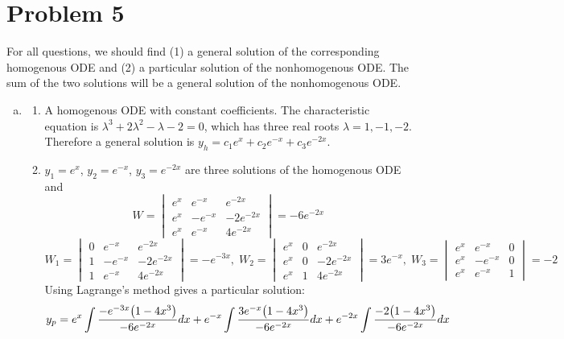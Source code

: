 \documentclass[10pt]{article}
\begin{document}
\section*{Problem 5}
For all questions, we should find (1) a general solution of the corresponding homogenous ODE and (2) a particular solution of the nonhomogenous ODE.
The sum of the two solutions will be a general solution of the nonhomogenous ODE.
\begin{enumerate}[(a), leftmargin=*]
    \item \begin{enumerate}[(1), leftmargin=*]
        \item A homogenous ODE with constant coefficients. The characteristic equation is $\lambda^3 + 2\lambda^2 - \lambda - 2 = 0$, which has three real roots $\lambda = 1, -1, -2$.
        Therefore a general solution is $y_h = c_1e^x + c_2e^{-x} + c_3e^{-2x}$.
        \item $y_1 = e^x$, $y_2 = e^{-x}$, $y_3 = e^{-2x}$ are three solutions of the homogenous ODE and 
        $$W = \begin{vmatrix}
            e^x & e^{-x}  & e^{-2x} \\
            e^x & -e^{-x} & -2e^{-2x} \\
            e^x & e^{-x}  & 4e^{-2x}
        \end{vmatrix} = -6e^{-2x}$$
        $$W_1 = \begin{vmatrix}
            0 & e^{-x}  & e^{-2x} \\
            1 & -e^{-x} & -2e^{-2x} \\
            1 & e^{-x}  & 4e^{-2x}
        \end{vmatrix} = -e^{-3x}, \; 
        W_2 = \begin{vmatrix}
            e^x & 0 & e^{-2x} \\
            e^x & 0 & -2e^{-2x} \\
            e^x & 1 & 4e^{-2x}
        \end{vmatrix} = 3e^{-x}, \; 
        W_3 = \begin{vmatrix}
            e^x & e^{-x}  & 0 \\
            e^x & -e^{-x} & 0 \\
            e^x & e^{-x}  & 1
        \end{vmatrix} = -2$$
        Using Lagrange's method gives a particular solution:
        \begin{align*}
            y_p &= e^x\int{\frac{-e^{-3x}\qty(1-4x^3)}{-6e^{-2x}}}dx + e^{-x}\int{\frac{3e^{-x}\qty(1-4x^3)}{-6e^{-2x}}}dx + e^{-2x}\int{\frac{-2\qty(1-4x^3)}{-6e^{-2x}}}dx\\

\end{align*}
\end{enumerate}
\end{enumerate}
\end{document}
